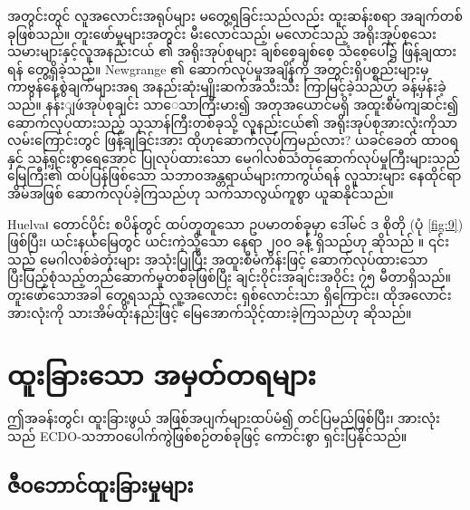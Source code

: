 \documentclass[10pt,twocolumn,letterpaper]{article}
\begin{document}
အတွင်းတွင် လူအလောင်းအရုပ်များ မတွေ့ရခြင်းသည်လည်း ထူးဆန်းစရာ အချက်တစ်ခုဖြစ်သည်။ တူးဖော်မှုများအတွင်း မီးလောင်သည့်၊ မလောင်သည့် အရိုးအုပ်စုသေးသမားများနှင့်လူအနည်းငယ် ၏ အရိုးအုပ်စုများ ချစ်စေ့ချစ်စေ့ သံစေ့ပေါ်၌ ဖြန့်ချထားရန် တွေ့ရှိခဲ့သည်။ Newgrange ၏ ဆောက်လုပ်မှုအချိန်ကို အတွင်းရှိပစ္စည်းများမှ ကာဗွန်နေ့စွဲချက်များအရ အနည်းဆုံးမျိုးဆက်အသီးသီး ကြာမြင့်ခဲ့သည်ဟု ခန့်မှန်းခဲ့သည်။ နန်းျဖဴအုပ်စုချင်း သာေသာကြီးမား၍ အတုအယောင်မရှိ အထူးစီမံကျဆင်း၍ ဆောက်လုပ်ထားသည့် သုသာန်ကြီးတစ်ခုသို့ လူနည်းငယ်၏ အရိုးအုပ်စုအားလုံးကိုသာ လမ်းကြောင်းတွင် ဖြန့်ချခြင်းအား ထိုဟုဆောက်လုပ်ကြမည်လား? ယခင်ခေတ် ထာဝရနှင့် သန့်ရှင်းစွာရေအောင် ပြုလုပ်ထားသော မေဂါလစ်သံတုဆောက်လုပ်မှုကြီးများသည် မြေကြီး၏ ထပ်ပြန်ဖြစ်သော သဘာဝအန္တရာယ်များကာကွယ်ရန် လူသားများ နေထိုင်ရာအိမ်အဖြစ် ဆောက်လုပ်ခဲ့ကြသည်ဟု သက်သာလွယ်ကူစွာ ယူဆနိုင်သည်။

Huelva၊ တောင်ပိုင်း စပိန်တွင် ထပ်တူတူသော ဥပမာတစ်ခုမှာ ဒေါ်မင် ဒ စိုတို (ပုံ \ref{fig:9}) ဖြစ်ပြီး၊ ယင်းနယ်မြေတွင် ယင်းကဲ့သို့သော နေရာ ၂၀၀ ခန့် ရှိသည်ဟု ဆိုသည် \cite{72,32}။ ၎င်းသည် မေဂါလစ်ခဲတုံးများ အသုံးပြုပြီး အထူးစီမံကိန်းဖြင့် ဆောက်လုပ်ထားသော ပြီးပြည့်စုံသည့်တည်ဆောက်မှုတစ်ခုဖြစ်ပြီး ချင်းဝိုင်းအချင်းအဝိုင်း ၇၅ မီတာရှိသည်။ တူးဖော်သောအခါ တွေ့ရသည့် လူ့အလောင်း ရှစ်လောင်းသာ ရှိကြောင်း၊ ထိုအလောင်းအားလုံးကို သားအိမ်ထိုးနည်းဖြင့် မြေအောက်သိုင့်ထားခဲ့ကြသည်ဟု ဆိုသည်။

\section{ထူးခြားသော အမှတ်တရများ}

ဤအခန်းတွင်၊ ထူးခြားဖွယ် အဖြစ်အပျက်များထပ်မံ၍ တင်ပြမည်ဖြစ်ပြီး၊ အားလုံးသည် ECDO-သဘာဝပေါက်ကွဲဖြစ်စဉ်တစ်ခုဖြင့် ကောင်းစွာ ရှင်းပြနိုင်သည်။

\subsection{ဇီဝဘောင်ထူးခြားမှုများ}
\end{document}

